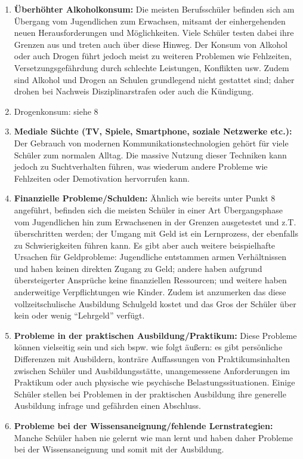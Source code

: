 \begin{enumerate}
	\item \textbf{Überhöhter Alkoholkonsum:} Die meisten Berufsschüler befinden sich am Übergang vom Jugendlichen zum Erwachsen, mitsamt der einhergehenden neuen Herausforderungen und Möglichkeiten. Viele Schüler testen dabei ihre Grenzen aus und treten auch über diese Hinweg. Der Konsum von Alkohol oder auch Drogen führt jedoch meist zu weiteren Problemen wie Fehlzeiten, Versetzungsgefährdung durch schlechte Leistungen, Konflikten usw. Zudem sind Alkohol und Drogen an Schulen grundlegend nicht gestattet sind; daher drohen bei Nachweis Disziplinarstrafen oder auch die Kündigung.
	\item Drogenkonsum: siehe 8
	\item \textbf{Mediale Süchte (TV, Spiele, Smartphone, soziale Netzwerke etc.):} Der Gebrauch von modernen Kommunikationstechnologien gehört für viele Schüler zum normalen Alltag. Die massive Nutzung dieser Techniken kann jedoch zu Suchtverhalten führen, was wiederum andere Probleme wie Fehlzeiten oder Demotivation hervorrufen kann.
	\item \textbf{Finanzielle Probleme/Schulden:} Ähnlich wie bereits unter Punkt 8 angeführt, befinden sich die meisten Schüler in einer Art Übergangsphase vom Jugendlichen hin zum Erwachsenen in der Grenzen ausgetestet und z.T. überschritten werden; der Umgang mit Geld ist ein Lernprozess, der ebenfalls zu Schwierigkeiten führen kann. Es gibt aber auch weitere beispielhafte Ursachen für Geldprobleme: Jugendliche entstammen armen Verhältnissen und haben keinen direkten Zugang zu Geld; andere haben aufgrund übersteigerter Ansprüche keine finanziellen Ressourcen; und weitere haben anderweitige Verpflichtungen wie Kinder. Zudem ist anzumerken das diese vollzeitschulische Ausbildung Schulgeld kostet und das Gros der Schüler über kein oder wenig "`Lehrgeld"' verfügt.
	\item \textbf{Probleme in der praktischen Ausbildung/Praktikum:} Diese Probleme können vielseitig sein und sich bspw. wie folgt äußern: es gibt persönliche Differenzen mit Ausbildern, konträre Auffassungen von Praktikumsinhalten zwischen Schüler und Ausbildungsstätte, unangemessene Anforderungen im Praktikum oder auch physische wie psychische Belastungssituationen. Einige Schüler stellen bei Problemen in der praktischen Ausbildung ihre generelle Ausbildung infrage und gefährden einen Abschluss.  
	\item \textbf{Probleme bei der Wissensaneignung/fehlende Lernstrategien:} Manche Schüler haben nie gelernt wie man lernt und haben daher Probleme bei der Wissensaneignung und somit mit der Ausbildung.

\end{enumerate}
